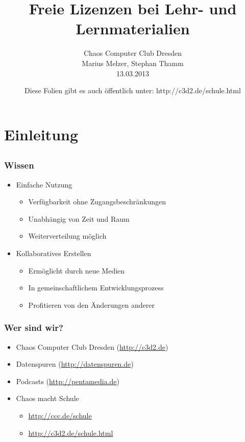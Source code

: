 \documentclass[table]{beamer}
\title{Freie Lizenzen bei Lehr- und Lernmaterialien}
\author{Chaos Computer Club Dresden\\Marius Melzer, Stephan Thamm\\13.03.2013}
\date{Diese Folien gibt es auch öffentlich unter: http://c3d2.de/schule.html}
\begin{document}
\maketitle

\frame{\tableofcontents[hideallsubsections]}

\section{Einleitung}
\subsection{}

\begin{frame}
    \frametitle{Wissen}
    \begin{itemize}
      \item<2-> Einfache Nutzung
      \begin{itemize}
        \item<3-> Verfügbarkeit ohne Zugangsbeschränkungen
        \item<4-> Unabhängig von Zeit und Raum
        \item<5-> Weiterverteilung möglich
      \end{itemize}
      \item<6-> Kollaboratives Erstellen
      \begin{itemize}
        \item<7-> Ermöglicht durch neue Medien
        \item<8-> In gemeinschaftlichem Entwicklungsprozess
        \item<9-> Profitieren von den Änderungen anderer
      \end{itemize}
    \end{itemize}
\end{frame}
 
\begin{frame}
    \frametitle{Wer sind wir?}
    \begin{itemize}
        \item<2-> Chaos Computer Club Dresden (\url{http://c3d2.de})
            \note{}
        \item<3-> Datenspuren (\url{http://datenspuren.de})
        \item<4-> Podcasts (\url{http://pentamedia.de})
        \item<5-> Chaos macht Schule
            \begin{itemize}
                \item<2-> \url{http://ccc.de/schule}
                \item<2-> \url{http://c3d2.de/schule.html}
            \end{itemize}
    \end{itemize}
\end{frame}
\end{document}
